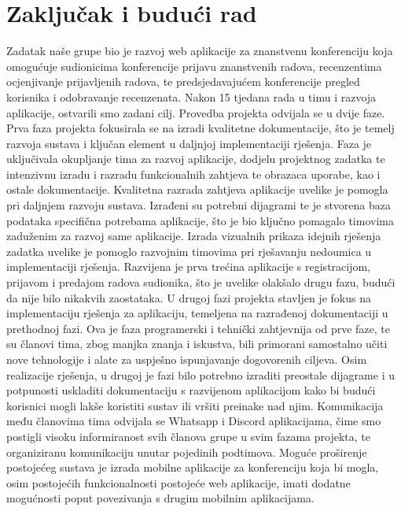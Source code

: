 \chapter{Zaključak i budući rad}
		 
		 Zadatak naše grupe bio je razvoj web aplikacije za znanstvenu konferenciju koja omogućuje sudionicima konferencije prijavu znanstvenih radova, recenzentima ocjenjivanje prijavljenih radova, te predsjedavajućem konferencije pregled korisnika i odobravanje recenzenata. Nakon 15 tjedana rada u timu i razvoja aplikacije, ostvarili smo zadani cilj. Provedba projekta odvijala se u dvije faze.
		 \newline
		 \newline
		 \indent Prva faza projekta fokusirala se na izradi kvalitetne dokumentacije, što je temelj razvoja sustava i ključan element u daljnjoj implementaciji rješenja. Faza je uključivala okupljanje tima za razvoj aplikacije, dodjelu projektnog zadatka te intenzivnu izradu i razradu funkcionalnih zahtjeva te obrazaca uporabe, kao i ostale dokumentacije. Kvalitetna razrada zahtjeva aplikacije uvelike je pomogla pri daljnjem razvoju sustava. Izrađeni su potrebni dijagrami te je stvorena baza podataka specifična potrebama aplikacije, što je bio ključno pomagalo timovima zaduženim za razvoj same aplikacije. Izrada vizualnih prikaza idejnih rješenja zadatka uvelike je pomoglo razvojnim timovima pri rješavanju nedoumica u implementaciji rješenja. Razvijena je prva trećina aplikacije s registracijom, prijavom i predajom radova sudionika, što je uvelike olakšalo drugu fazu, budući da nije bilo nikakvih zaostataka.
		 \newline
		 \newline
		 \indent U drugoj fazi projekta stavljen je fokus na implementaciju rješenja za aplikaciju, temeljena na razrađenoj dokumentaciji u prethodnoj fazi. Ova je faza programerski i tehnički zahtjevnija od prve faze, te su članovi tima, zbog manjka znanja i iskustva, bili primorani samostalno učiti nove tehnologije i alate za uspješno ispunjavanje dogovorenih ciljeva. Osim realizacije rješenja, u drugoj je fazi bilo potrebno izraditi preostale dijagrame i u potpunosti uskladiti dokumentaciju s razvijenom aplikacijom kako bi budući korisnici mogli lakše koristiti sustav ili vršiti preinake nad njim. 
		 \newline
		 \newline
		 \indent Komunikacija među članovima tima odvijala se Whatsapp i Discord aplikacijama, čime smo postigli visoku informiranost svih članova grupe u svim fazama projekta, te organiziranu komunikaciju unutar pojedinih podtimova. Moguće proširenje postojećeg sustava je izrada mobilne aplikacije za konferenciju koja bi mogla, osim postojećih funkcionalnosti postojeće web aplikacije, imati dodatne mogućnosti poput povezivanja s drugim mobilnim aplikacijama. 
